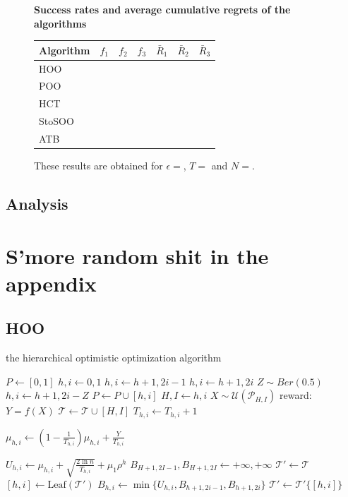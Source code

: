\documentclass[a4paper,10pt]{article}
\begin{document}
\begin{figure}
\label{restab}
\centering
\textbf{Success rates and average cumulative regrets of the algorithms}
\begin{tabular}{|l|c|c|c|c|c|c|}
\hline
Algorithm & $f_1$ & $f_2$ & $f_3$ & $\bar{R}_1$ & $\bar{R}_2$ & $\bar{R}_3$ \\
\hline
HOO & & & & & &\\
POO & & & & & &\\
HCT & & & & & &\\
StoSOO & & & & & &\\
ATB & & & & & &\\
\hline
\end{tabular}
\caption{These results are obtained for $\epsilon=$, $T=$ and $N=$.}
\end{figure}

\subsection{Analysis}

\appendix
\section{S'more random shit in the appendix}
\subsection{HOO}
\begin{algorithm}[!Htop]
	\small
\caption{the hierarchical optimistic optimization algorithm}
\begin{algorithmic}[1]
		\State $P \gets {[0,1]}$
		\State $h,i\gets 0,1$
				\State $h,i \gets h+1,2i-1 $
				\State $h,i \gets h+1,2i $
			\Else
				\State $Z \sim Ber(0.5)$
				\State $h,i \gets h+1,2i-Z$
			\EndIf
			\State $P \gets P \cup {[h,i]}$
		\EndWhile
		\State $H,I \gets h,i$
		\State $X \sim \mathcal{U}(\mathcal{P}_{H,I})$
		\State reward: $Y = f(X)$
		\State $\mathcal{T} \gets \mathcal{T} \cup {[H,I]}$
			\State $T_{h,i} \gets T_{h,i}+1$
			\begin{large}
			\State $\mu_{h,i}\gets (1-\frac{1}{T_{h,i}})\mu_{h,i}+\frac{Y}{T_{h,i}}$
			\end{large}
		\EndFor
			\State $U_{h,i}\gets \mu_{h,i}+\sqrt{\frac{2\ln n}{T_{h,i}}}+\mu_1 \rho^h$
		\EndFor
		\State $B_{H+1,2I-1},B_{H+1,2I} \gets +\infty,+\infty$
		\State $\mathcal{T}' \gets \mathcal{T}$
			\State $[h,i] \gets \text{Leaf}(\mathcal{T}')$
			\State $B_{h,i} \gets \min\{U_{h,i},B_{h+1,2i-1},B_{h+1,2i}\}$
			\State $\mathcal{T}' \gets \mathcal{T}'\{[h,i]\}$
		\EndWhile
	\EndFor
\end{algorithmic}
\end{algorithm}
\end{document}

